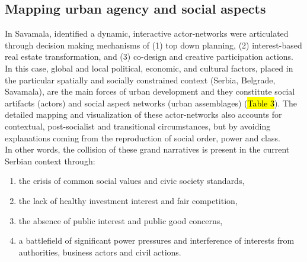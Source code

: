 \documentclass[11pt]{report}
\begin{document}
\subsection{Mapping urban agency and social aspects}

In Savamala, identified a dynamic, interactive actor-networks were articulated through decision making mechanisms of
(1) top down planning,
(2) interest-based real estate transformation,
and
(3) co-design and creative participation actions.
In this case, global and local political, economic, and cultural factors, placed in the particular spatially and socially constrained context (Serbia, Belgrade, Savamala), are the main forces of urban development and they constitute social artifacts (actors) and social aspect networks (urban assemblages) (\hl{Table 3}).
The detailed mapping and visualization of these actor-networks also accounts for contextual, post-socialist and transitional circumstances, but by avoiding explanations coming from the reproduction of social order, power and class.
\\

In other words, the collision of these grand narratives is present in the current Serbian context through:
\begin{enumerate}
\item  the crisis of common social values and civic society standards, 
\item the lack of healthy investment interest and fair competition, 
\item the absence of public interest and public good concerns, 
\item a battlefield of significant power pressures and interference of interests from authorities, business actors and civil actions.
\end{enumerate}
\end{document}
